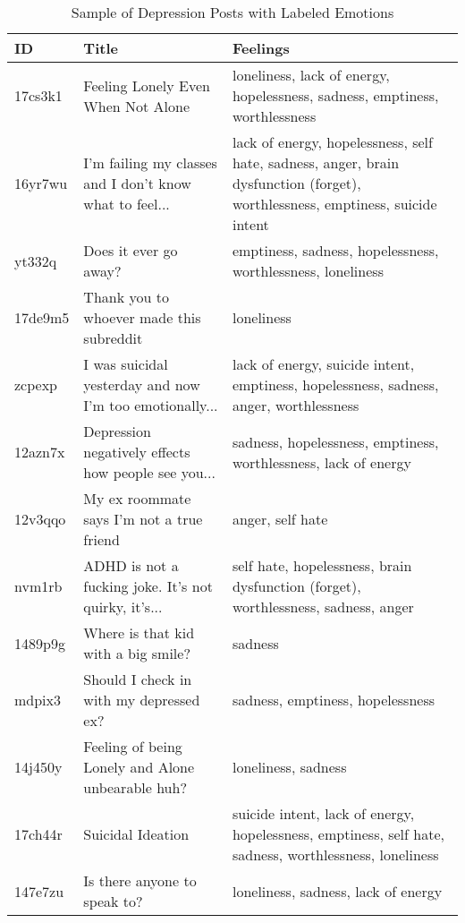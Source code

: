 
\begin{table}[htbp]
\centering
\caption{Sample of Depression Posts with Labeled Emotions}
\label{tab:depression_data}
\begin{tabular}{|l|p{6cm}|p{7cm}|}
\hline
\textbf{ID} & \textbf{Title} & \textbf{Feelings} \\
\hline
17cs3k1 & Feeling Lonely Even When Not Alone & loneliness, lack of energy, hopelessness, sadness, emptiness, worthlessness \\
\hline
16yr7wu & I'm failing my classes and I don't know what to feel... & lack of energy, hopelessness, self hate, sadness, anger, brain dysfunction (forget), worthlessness, emptiness, suicide intent \\
\hline
yt332q & Does it ever go away? & emptiness, sadness, hopelessness, worthlessness, loneliness \\
\hline
17de9m5 & Thank you to whoever made this subreddit & loneliness \\
\hline
zcpexp & I was suicidal yesterday and now I'm too emotionally... & lack of energy, suicide intent, emptiness, hopelessness, sadness, anger, worthlessness \\
\hline
12azn7x & Depression negatively effects how people see you... & sadness, hopelessness, emptiness, worthlessness, lack of energy \\
\hline
12v3qqo & My ex roommate says I’m not a true friend & anger, self hate \\
\hline
nvm1rb & ADHD is not a fucking joke. It's not quirky, it's... & self hate, hopelessness, brain dysfunction (forget), worthlessness, sadness, anger \\
\hline
1489p9g & Where is that kid with a big smile? & sadness \\
\hline
mdpix3 & Should I check in with my depressed ex? & sadness, emptiness, hopelessness \\
\hline
14j450y & Feeling of being Lonely and Alone unbearable huh? & loneliness, sadness \\
\hline
17ch44r & Suicidal Ideation & suicide intent, lack of energy, hopelessness, emptiness, self hate, sadness, worthlessness, loneliness \\
\hline
147e7zu & Is there anyone to speak to? & loneliness, sadness, lack of energy \\
\hline
\end{tabular}
\end{table}
